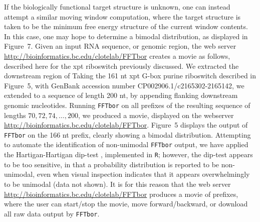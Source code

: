 If the biologically functional target structure is unknown, one can
instead attempt a similar moving window computation, where the target
structure is taken to be the minimum free energy structure of the
current window contents. In this case, one may hope to determine a
bimodal distribution, as displayed in Figure~7.
Given an input RNA sequence, or genomic region, the
web server \url{http://bioinformatics.bc.edu/clotelab/FFTbor}
creates a movie as follows, described here for the xpt riboswitch
previously discussed.  We extracted the downstream region of
Taking the
161 nt xpt G-box purine riboswitch described in Figure~5,
with GenBank accession number CP002906.1/c2165302-2165142, we extended
to a sequence of length 200 nt, by appending flanking
downstream genomic nucleotides.  Running {\tt FFTbor} on all
prefixes of the resulting sequence of lengths
$70,72,74,\ldots,200$, we produced a movie, displayed on the webserver
\url{http://bioinformatics.bc.edu/clotelab/FFTbor}.
Figure~5 displays the output of {\tt FFTbor} on the
166 nt prefix, clearly showing a bimodal distribution. Attempting to
automate the identification of non-unimodal {\tt FFTbor} output, we have
applied the Hartigan-Hartigan dip-test \cite{hartiganDipTest},
implemented in {\tt R}; however,
the dip-test appears to be too sensitive, in that a probability distribution
is reported to be non-unimodal, even when visual inspection indicates that
it appears overwhelmingly to be unimodal (data not shown). It is for this
reason that the web server
\url{http://bioinformatics.bc.edu/clotelab/FFTbor} produces a movie of
prefixes, where the user can start/stop the movie,
move forward/backward, or download all raw data output by {\tt FFTbor}.


